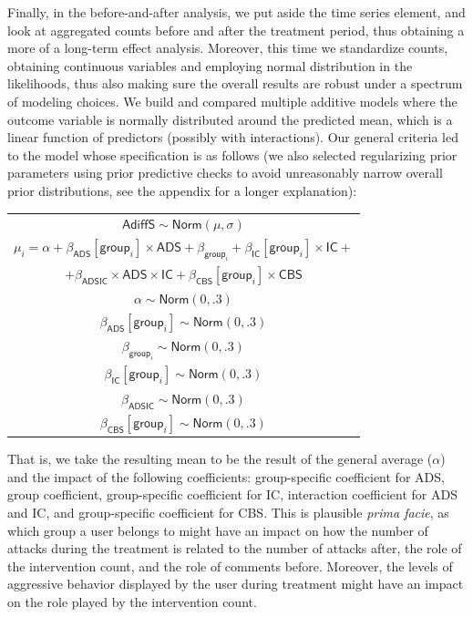 \documentclass[preprint,12pt]{elsarticle}
\begin{document}
Finally, in the before-and-after analysis, we put aside the time series
element, and look at aggregated counts before and after the treatment
period, thus obtaining a more of a long-term effect analysis. Moreover,
this time we standardize counts, obtaining continuous variables and
employing normal distribution in the likelihoods, thus also making sure
the overall results are robust under a spectrum of modeling choices. We
build and compared multiple additive models where the outcome variable
is normally distributed around the predicted mean, which is a linear
function of predictors (possibly with interactions). Our general criteria
led to the model whose specification is as follows (we also selected
regularizing prior parameters using prior predictive checks to avoid
unreasonably narrow overall prior distributions, see the appendix for a longer explanation):


\footnotesize


\begin{center}
\begin{tabular}{c}
$\mathsf{AdiffS}  \sim \textsf{Norm}(\mu, \sigma)$\\
$\mu_i  = \alpha + \beta_{\mathsf{ADS}}[\mathsf{group}_i]\times \mathsf{ADS} + \beta_{\mathsf{group}_i}  +
 \beta_{\mathsf{IC}}[\mathsf{group}_i]\times \mathsf{IC} + $\\
$  + \beta_{\mathsf{ADSIC}}\times \mathsf{ADS} \times \mathsf{IC} + \beta_{\mathsf{CBS}}[\mathsf{group}_i] \times \mathsf{CBS}$\\
$ \alpha  \sim \textsf{Norm}(0,.3)$\\
$\beta_{\mathsf{ADS}}[\mathsf{group}_i]  \sim \textsf{Norm}(0,.3)$\\
$\beta_{\mathsf{group}_i}  \sim \textsf{Norm}(0,.3)$\\
$\beta_{\mathsf{IC}}[\mathsf{group}_i]  \sim \textsf{Norm}(0,.3)$\\
$ \beta_{\mathsf{ADSIC}}  \sim \textsf{Norm}(0,.3)$\\
$ \beta_{\mathsf{CBS}}[\mathsf{group}_i] \sim \textsf{Norm}(0,.3)$\\
\end{tabular}
\end{center}

\normalsize 

That is, we take the resulting mean to be the result of the general
average (\(\alpha\)) and the impact of the following coefficients:
group-specific coefficient for \textsf{ADS}, group coefficient,
group-specific coefficient for \textsf{IC}, interaction coefficient for
\textsf{ADS} and \textsf{IC}, and group-specific coefficient for
\textsf{CBS}. This is plausible \emph{prima facie}, as which group a
user belongs to might have an impact on how the number of attacks during
the treatment is related to the number of attacks after, the role of
the intervention count, and the role of comments before. Moreover, the
levels of aggressive behavior displayed by the user during treatment
might have an impact on the role played by the intervention count.
\end{document}
